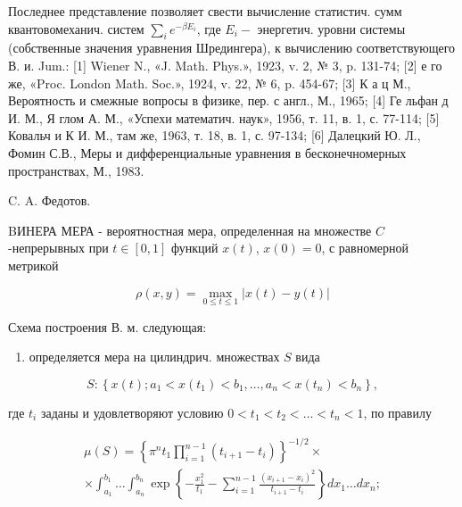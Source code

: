 \documentclass[10pt]{article}
\begin{document}
Последнее представление позволяет свести вычисление статистич. сумм квантовомеханич. систем $\sum_{i} e^{-\beta E_{i}}$, где $E_{i}-$ энергетич. уровни системы (собственные значения уравнения Шредингера), к вычислению соответствующего В. и. Jum.: [1] Wiener N., «J. Math. Phys.», 1923, v. 2, № 3, p. 131-74; [2] е го же, «Proc. London Math. Soc.», 1924, v. 22, № 6, p. 454-67; [3] К а ц М., Вероятность и смежные вопросы в физике, пер. с англ., М., 1965; [4] Ге льфан д И. М., Я глом А. М., «Успехи математич. наук», 1956, т. 11, в. 1, с. 77-114; [5] Ковальч и К И. М., там же, 1963, т. 18, в. 1, с. 97-134; [6] Далецкий Ю. Л., Фомин С.В., Меры и дифференциальные уравнения в бесконечномерных пространствах, М., 1983.



C. A. Федотов.



BИНЕРА МЕРА - вероятностная мера, определенная на множестве $C$-непрерывных при $t \in[0,1]$ функций $x(t)$, $x(0)=0$, с равномерной метрикой



\[

\rho(x, y)=\max _{0 \leqslant t \leqslant 1}|x(t)-y(t)|

\]



Схема построения В. м. следующая:



\begin{enumerate}

  \item определяется мера на цилиндрич. множествах $S$ вида

\end{enumerate}



\[

S:\left\{x(t) ; a_{1}<x\left(t_{1}\right)<b_{1}, \ldots, a_{n}<x\left(t_{n}\right)<b_{n}\right\},

\]



где $t_{i}$ заданы и удовлетворяют условию $0<t_{1}<t_{2}<\ldots<t_{n}<1$, по правилу



\[

\begin{gathered}

\mu(S)=\left\{\pi^{n} t_{1} \prod_{i=1}^{n-1}\left(t_{i+1}-t_{i}\right)\right\}^{-1 / 2} \times \\

\times \int_{a_{1}}^{b_{1}} \ldots \int_{a_{n}}^{b_{n}} \exp \left\{-\frac{x_{1}^{2}}{t_{1}}-\sum_{i=1}^{n-1} \frac{\left(x_{i+1}-x_{i}\right)^{2}}{t_{i+1}-t_{i}}\right\} d x_{1} \ldots d x_{n} ;

\end{gathered}

\]
\end{document}
